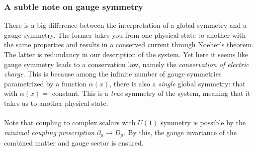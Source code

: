 \subsubsection{A subtle note on gauge symmetry}
There is a big difference between the interpretation of a global symmetry and a gauge symmetry. The former takes you from one physical state to another with the same properties and results in a conserved current through Noeher's theorem. The latter is redundancy in our description of the system. Yet here it seems like gauge symmetry leads to a conservation law, namely the \emph{conservation of electric charge}. This is because among the infinite number of gauge symmetries parametrized by a function $\alpha(x)$, there is also a \emph{single} global symmetry: that with $\alpha(x) =$ constant. This is a \emph{true} symmetry of the system, meaning that it takes us to another physical state.\\
\\
Note that coupling to complex scalars with $U(1)$ symmetry is possible by the \emph{minimal coupling prescription} $\partial_{\mu} \rightarrow D_{\mu}$. By this, the gauge invariance of the combined matter and gauge sector is ensured.



